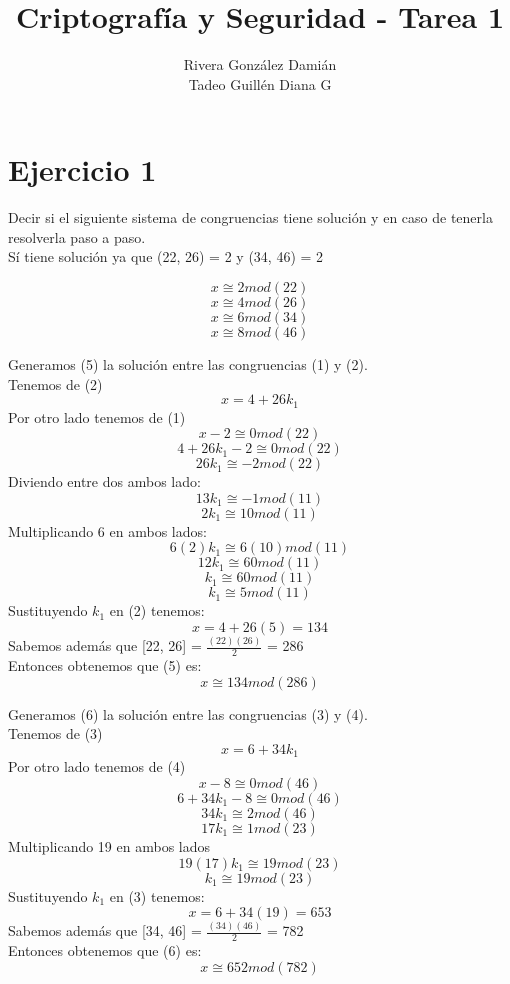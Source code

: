 \documentclass[12pt, letterpaper]{article}
\title{Criptografía y Seguridad - Tarea 1}
\author{Rivera González Damián\\Tadeo Guillén Diana G}
\begin{document}
\maketitle
\section*{Ejercicio 1}
Decir si el siguiente sistema de congruencias tiene solución y en caso de tenerla resolverla paso a paso.\\
Sí tiene solución ya que (22, 26) = 2 y (34, 46) = 2

\begin{equation}
x \cong 2 mod (22)
\end{equation}
\begin{equation}
x \cong 4 mod (26)
\end{equation}
\begin{equation}
x \cong 6 mod (34)
\end{equation}
\begin{equation}
x \cong 8 mod (46)
\end{equation}

Generamos (5) la solución entre las congruencias (1) y (2).\\
Tenemos de (2) $$x = 4 + 26k_1$$
Por otro lado tenemos de (1)\\
$$x - 2 \cong 0 mod (22)$$
$$4 + 26k_1 -2 \cong 0 mod (22)$$
$$26k_1 \cong -2 mod (22)$$
Diviendo entre dos ambos lado:
$$13k_1 \cong -1 mod (11)$$
$$2k_1 \cong 10 mod (11)$$
Multiplicando 6 en ambos lados:
$$6(2)k_1 \cong 6(10) mod (11)$$
$$12k_1 \cong 60 mod (11)$$
$$k_1 \cong 60 mod (11)$$
$$k_1 \cong 5 mod (11)$$
Sustituyendo $k_1$ en (2) tenemos:\\
$$x = 4 + 26(5) = 134$$
Sabemos además que [22, 26] = $\frac{(22)(26)}{2}$ = 286\\
Entonces obtenemos que (5) es:
\begin{equation}
x \cong 134 mod (286)
\end{equation}


Generamos (6) la solución entre las congruencias (3) y (4).\\
Tenemos de (3) $$x = 6 + 34k_1$$
Por otro lado tenemos de (4)\\
$$x - 8 \cong 0 mod (46)$$
$$6 + 34k_1 -8 \cong 0 mod (46)$$
$$34k_1 \cong 2 mod (46)$$
$$17k_1 \cong 1 mod (23)$$
Multiplicando 19 en ambos lados\\
$$19(17)k_1 \cong 19 mod (23)$$
$$k_1 \cong 19 mod (23)$$
Sustituyendo $k_1$ en (3) tenemos:\\
$$x = 6 + 34(19) = 653$$
Sabemos además que [34, 46] = $\frac{(34)(46)}{2}$ = 782\\
Entonces obtenemos que (6) es:
\begin{equation}
x \cong 652 mod (782)
\end{equation}
\end{document}
